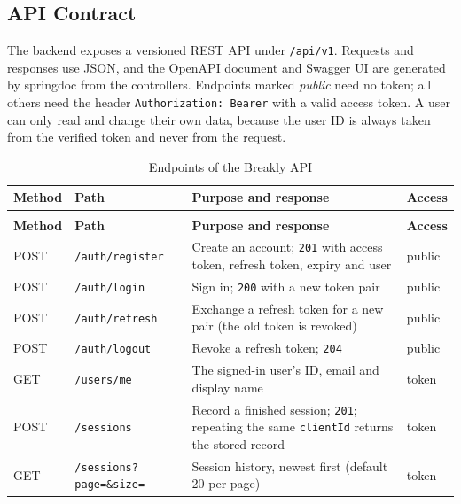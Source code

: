 \subsection{API Contract}
\label{sec:api-contract}

The backend exposes a versioned REST API under \texttt{/api/v1}. Requests and
responses use JSON, and the OpenAPI document and Swagger UI are generated by
springdoc from the controllers. Endpoints marked \textit{public} need no
token; all others need the header \texttt{Authorization: Bearer} with a valid
access token. A user can only read and change their own data, because the user
ID is always taken from the verified token and never from the request.

\begingroup
\small
\renewcommand{\arraystretch}{1.2}
\begin{longtable}{|>{\raggedright\arraybackslash}p{1.2cm}|>{\raggedright\arraybackslash}p{4.4cm}|>{\raggedright\arraybackslash}p{6.4cm}|>{\raggedright\arraybackslash}p{2.0cm}|}
\caption{Endpoints of the Breakly API}\label{tab:api-endpoints}\\ \hline
\textbf{Method} & \textbf{Path} & \textbf{Purpose and response} & \textbf{Access} \\ \hline
\endfirsthead
\multicolumn{4}{c}{{\bfseries \tablename\ \thetable{} -- continued from previous page}} \\ \hline
\textbf{Method} & \textbf{Path} & \textbf{Purpose and response} & \textbf{Access} \\ \hline
\endhead
POST & \texttt{/auth/register} & Create an account; \texttt{201} with access token, refresh token, expiry and user & public \\ \hline
POST & \texttt{/auth/login} & Sign in; \texttt{200} with a new token pair & public \\ \hline
POST & \texttt{/auth/refresh} & Exchange a refresh token for a new pair (the old token is revoked) & public \\ \hline
POST & \texttt{/auth/logout} & Revoke a refresh token; \texttt{204} & public \\ \hline
GET & \texttt{/users/me} & The signed-in user's ID, email and display name & token \\ \hline
POST & \texttt{/sessions} & Record a finished session; \texttt{201}; repeating the same \texttt{clientId} returns the stored record & token \\ \hline
GET & \texttt{/sessions?page=\&size=} & Session history, newest first (default 20 per page) & token \\ \hline

\end{longtable}
